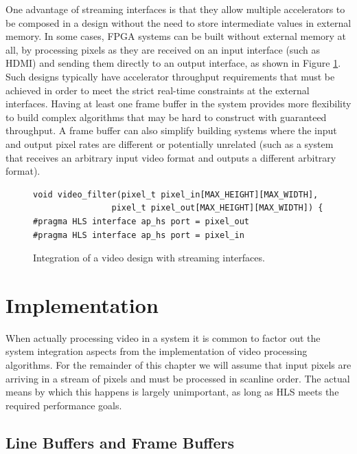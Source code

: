 One advantage of streaming interfaces is that they allow multiple accelerators to be composed in a design without the need to store intermediate values in external memory.  In some cases, FPGA systems can be built without external memory at all, by processing pixels as they are received on an input interface (such as HDMI) and sending them directly to an output interface, as shown in Figure \ref{fig:video:streaming_interface}.  Such designs typically have accelerator throughput requirements that must be achieved in order to meet the strict real-time constraints at the external interfaces.   Having at least one frame buffer in the system provides more flexibility to build complex algorithms that may be hard to construct with guaranteed throughput.  A frame buffer can also simplify building systems where the input and output pixel rates are different or potentially unrelated (such as a system that receives an arbitrary input video format and outputs a different arbitrary format).

\begin{figure}
\centering
\framebox{}
\begin{lstlisting}
void video_filter(pixel_t pixel_in[MAX_HEIGHT][MAX_WIDTH],
				pixel_t pixel_out[MAX_HEIGHT][MAX_WIDTH]) {
#pragma HLS interface ap_hs port = pixel_out
#pragma HLS interface ap_hs port = pixel_in
\end{lstlisting}
\caption{Integration of a video design with streaming interfaces.}\label{fig:video:streaming_interface}
\end{figure}

\section{Implementation}

When actually processing video in a system it is common to factor out the system integration aspects from the implementation of video processing algorithms.  For the remainder of this chapter we will assume that input pixels are arriving in a stream of pixels and must be processed in scanline order.  The actual means by which this happens is largely unimportant, as long as HLS meets the required performance goals. 

\subsection{Line Buffers and Frame Buffers}
\label{sec:video:buffering}


